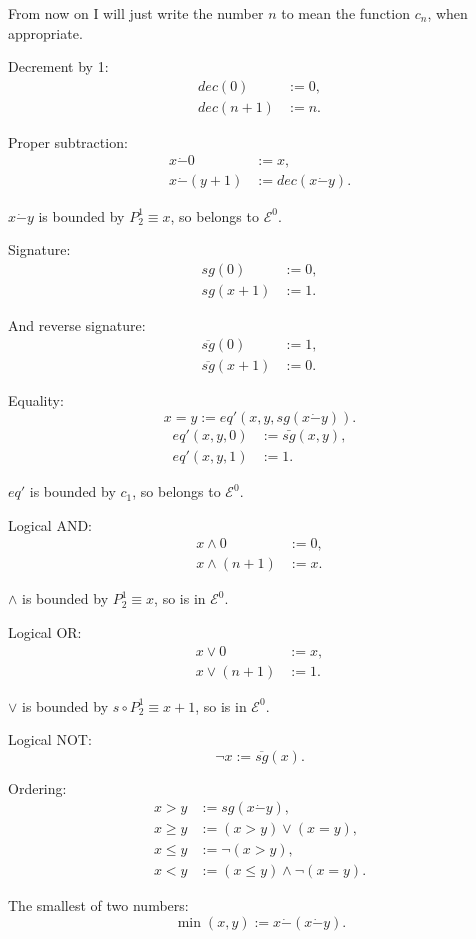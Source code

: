 \documentclass[a4paper]{article}
\newcommand{\grz}[1]{$\mathcal{E}^{#1}$}	%
\newcommand{\psub}{\dot -}	%
\newcommand{\rsg}{\overline{sg}} %
\newcommand{\recur}[1]{\begin{equation} \begin{split} #1 \end{split} \end{equation}}	%
\newcommand{\recurN}[1]{\begin{equation*} \begin{split} #1 \end{split} \end{equation*}}	%
\theoremstyle{plain}
\theoremstyle{definition}
\begin{document}
From now on I will just write the number $n$ to mean the function $c_n$, when appropriate.

Decrement by 1:
\recur{
	dec(0) &:= 0, \\
	dec(n+1) &:= n.
}

Proper subtraction:
\recur{
	x \psub 0 &:= x, \\
	x \psub (y+1) &:= dec(x \psub y).
}

$x \psub y$ is bounded by $P_2^1 \equiv x$, so belongs to \grz{0}.

Signature:
\recur{
	sg(0) &:= 0, 	\\
	sg(x+1) &:= 1.
}

And reverse signature:
\recur{
	\rsg(0) &:= 1, \\
	\rsg(x+1) &:= 0.
}

Equality:
\begin{equation}	x = y := eq'(x,y,sg(x \psub y)). \end{equation}
\recurN{
	eq'(x,y,0) &:= \bar{sg}(x,y), \\
	eq'(x,y,1) &:= 1.
}

$eq'$ is bounded by $c_1$, so belongs to \grz{0}.

Logical AND:
\recur{
	x \wedge 0 &:= 0,	 \\
	x \wedge (n+1) &:= x.
}

$\wedge$ is bounded by $P_2^1 \equiv x$, so is in \grz{0}.

Logical OR:
\recur{
	x \vee 0 &:= x, 		\\
	x \vee (n+1) &:= 1.
}

$\vee$ is bounded by $s \circ P_2^1 \equiv x+1$, so is in \grz{0}.

Logical NOT:
\begin{equation} \neg x := \rsg(x). \end{equation}

Ordering:
\begin{equation} \begin{split} 
	x>y &:= sg(x \psub y), 	\\
	x \geq y &:= (x > y) \vee (x=y),	\\
	x \leq y &:= \neg (x>y),	\\
	x < y &:= (x \leq y) \wedge \neg (x=y).
\end{split}\end{equation} 


The smallest of two numbers:
\begin{equation} \min(x,y) := x \psub ( x \psub y). \end{equation}
\end{document}
